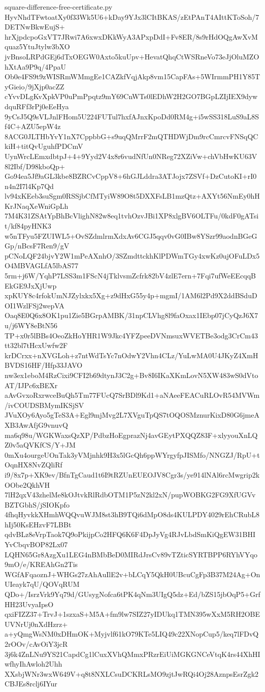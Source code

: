 \documentclass[11pt]{article}
\theoremstyle{definition}
\theoremstyle{remark}
\begin{document}
\begin{filecontents*}[overwrite]{square-difference-free-certificate.py}
HyvNhdTFwtoatXy0f33Wk5U6+kDay9YJx3lCItBKAS/zEtPAnT4AIttKToSoh/7DETNwBkwEujS+
hrXjpdcpoGxVT7JRwi7A6xwxDKkWyA3APxpDdI+Fv8ER/8s9rHdOQgAwXvMquaz5YtuJtylw3bXO
jvBnsoLRPdGEj6dTxOEGW0Axto5kuUpv+HevatQhqCtWSRneVo73eJjOluMZOhXtAa9P9q/4PpaU
Ob0e4FS9t9zWISRmWMmgEe1CAZkfVqjAkp8vm15CapFAs+5WIrmmPH1Y85TyGieio/9jXjp0acZZ
cYvvDLgKvXpkVP0uPmPpqtz9mY69CnWTs0lEDhW2H2GO7BGpLZIjIEX9dywdquRFf3rPj0eEeHya
9yCsJ5Q9sVLJnlFHom5U224FUTul7hxfAJnxKpoDd0RM4g+i5wSS318LuS9aL8Sf4C+AZU5epW4z
8ACG0JLTHbYvY1nX7CppbbG+s9uqQMrrF2mQTHDWjDm9rcCmrcvFNSqQCkiH+titQvUguhfPDCmV
UynWrcLEmxdbtpJ+4+9Yyd2V4x8r6vudNfUn0NReg72XZiVw+chVbHwKU63V8l2Ibf/D98kboQp+
Go94ea5Jf9aGL3kbe8BZRCvCppV8+6hGJLddra3ATJojx7ZSVf+DzCutoKI+rI0n4n2I7l4Kp7Qd
lv94xKEeb3suSgm0RSSjbCfMTyiW89O8t5DXXFsLB1mzQtz+AXYt56NmEy0hHKrJNaqXeWniGpLh
7M4K31ZSAtYpBhBcVlighN82w8eq1tvhOzvJBi1XP8xlgBV6OLTFu/0kdF0gATsit/kf84pyHNK3
w5nTFyu5FZUIWL5+OvSZdmlrmXdxAv6CGJ5qqv0vG0IBw8YSzr99aodnBGeGGp/nBcsF7Ren9/gV
pCNoLQF24bjvY2W1mPeAXnhO/3SZmdttckhKlPDWmTGy4xwKz0ujOFuLDx5O4MBVAGLfA5lbAS77
5rm+j6W/YqhP7LSS3m1FScN4jTklvsmZcfrk82bV4zlE7ern+7Fqi7ufWeEEcqqBEkGE9JxXjUwp
xpKUY8c4rfokUmNJZylxkx5Xg+z9dHxG55y4p+mgmI/1AM6l2Pd9X2ddBSduDOI1WzlFSj2wepVA
Oaq8E0Q6x8OK1pu1Zie5BGrpAMBK/31npCLVhg8l9faOxax1IEbp07jCyQzJ6X7u/j6WY8eBtN56
TP+x0r5lBBs4OeoZkHoYHR1W9Jkc4YFZpeeDVNmsuxWVETBe3odg3CrCm43tt32bl7tHcxUwfw2F
krDCrxx+nXVGLoh+z7ntWdTsYc7nOdwY2Vhn4CLz/YuLwMA0U4JKyZ4XmHBVDS16HF/Hfp33JAVO
nw3ex1eboM4RzCixi9CFI2b69dtynJ3C2g+Bv8I6IKaXKmLovN5XW483wS0dVtoAT/IJPc6xBEXr
aAvGvxoRxrwceBuQh5Tm77FUcQ7SrBDl9Kd1+aNAeeFEACuRLOvR54MVWm/ivCOUDSBMymIKSjSV
JVuXOy6Ayo5gTeS3A+Egl9mjMvg2L7XVguTpQS7tOQOSMznurKixD80G6jmeAXB3AwAfjG9vnuvQ
ma6q98u/WGKWaxsQzXP/PdbzHoEgprazNj4avGEytPXQQZ83F+xlyyouXnLQZ0v5aQVKfCS/Y+JM
0mXu4ourgeUOnTak3yVMjnhk9H3x5lGcQh6ppWYrgyfpJISMfo/NNGZJ/RpU+tOqnHX8NvZQliRf
i9/8x7p+XK9ev/BfnTgCaud1t6I9tRZUnEUEOJV8Cgr3s/ye914lNAl6rcMwgrip2kOObe2QkhVH
7lH2qxV43zhelMe8kOJtvkRlRdbOTM1P5zN2kl2xN/pupWOBKG2FG9XfUGVvBZTGbhS/jSIOKpfo
4fhqHyvkkXHmhWQQvuWJM8st3hB9TQi6dMpO8ds4KULPDY4029rEhCRubL8hIj50KsEHzvF7LBBt
qdvBLz8eVrpTaok7Q9oPkijpCo2HFQ6K6F4DpJyVg4RJvLbdSmKiQgEW31BHIYvCbqvBOP82Lx07
LQHN65Gr8AzgXu1LEG4nBMbBeD0MIRdJrsCv89vTZticSYRTBPP6RYhVYqo9mO/e/KREAhGn2Tis
WGfAFqaoznJ+WHGs27zAhAuIlE2v+bLCqY5QkH0UBcuCgFp3B37M24Ag+OnUIeayk7qU/QOVqRUM
QDo+/IsrzVrk9Yq79d/GUsygNofca6tPK4qNm3UIgQ5dz+Ed/bZS15jbOqP5+GrfHH23UvyaIpsO
qxiFIZZ37+TrvJ+1szxaS+M5A+fm9lw7SIZ27yIDUkq1TMN395wXxM5RH2OBEUVNrUj0nXdHzrz+
a+yQmgWsNM0xDHmOK+Myjvlf61kO79KTe5LIQ49c22XNopCup5/keq7lFDvQ2rOOv/cAvOiY3jcR
3j6k4ZnLNu9YS21CapdCg1lCuxXVhQMmxPRzrEiUiMGKGNCeVtqK4rs44XhHIwfhyIhAwloh2Uhh
XXsbjWNr3wxW649V+q8t8NXLCsuDCKRLsMO9zjtJwRQi4Oj28AznpsEsrZgk2CBJEs8rclj6IYur

\end{filecontents*}
\end{document}

